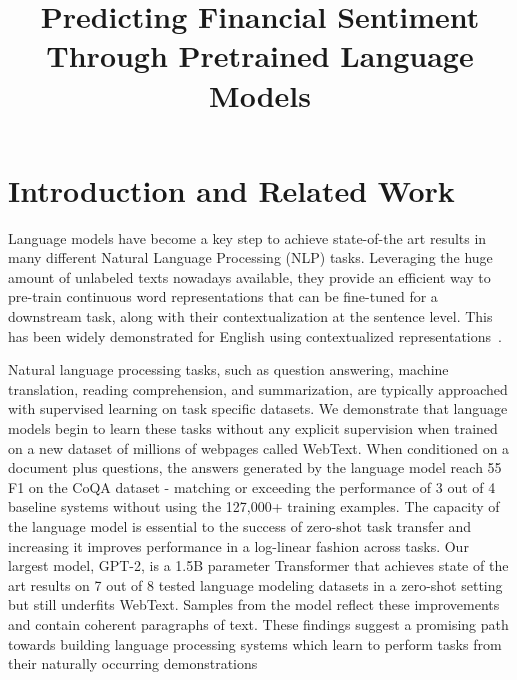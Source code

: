 \documentclass[11pt]{article}
\title{\vspace{-4cm} Predicting Financial Sentiment Through Pretrained Language Models}
\author{}
\date{}
\begin{document}
\maketitle



\section{Introduction and Related Work}

Language models have become a key step to achieve state-of-the art results in many different Natural Language Processing (NLP)
tasks. Leveraging the huge amount of unlabeled texts nowadays available, they provide an efficient way to pre-train continuous word
representations that can be fine-tuned for a downstream task, along with their contextualization at the sentence level. This has been
widely demonstrated for English using contextualized representations~\cite{dai2015, peters2018, howard2018, radford2018, devlin2019, yang2019}.

Natural language processing tasks, such as question answering, machine translation, reading comprehension, and summarization, are typically
approached with supervised learning on task specific datasets. We demonstrate that language
models begin to learn these tasks without any explicit supervision when trained on a new dataset
of millions of webpages called WebText. When
conditioned on a document plus questions, the answers generated by the language model reach 55
F1 on the CoQA dataset - matching or exceeding the performance of 3 out of 4 baseline systems
without using the 127,000+ training examples. The capacity of the language model is essential
to the success of zero-shot task transfer and increasing it improves performance in a log-linear
fashion across tasks. Our largest model, GPT-2,
is a 1.5B parameter Transformer that achieves
state of the art results on 7 out of 8 tested language modeling datasets in a zero-shot setting
but still underfits WebText. Samples from the
model reflect these improvements and contain coherent paragraphs of text. These findings suggest
a promising path towards building language processing systems which learn to perform tasks from
their naturally occurring demonstrations~\cite{radford2019} 
\end{document}
